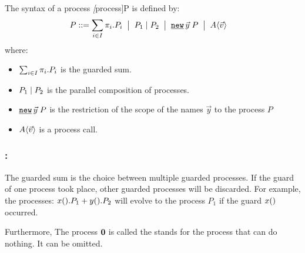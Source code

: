 \begin{definition}
\label{def_process_syntax}
The syntax of a \picalc{} process \textit[process]{P} is defined by: 
\begin{align*}
 P & \syntdef \procsum \ebnf \procpar{P_1}{P_2} \ebnf \procres{\vec{y}}{P} \ebnf \proccall{A}{\vec{v}}
\end{align*}
where:
\begin{itemize}
\item $\sum_{i\in I}{\pi_i.P_i}$ is the guarded sum.
\item $P_1 \mid P_2$ is the parallel composition of processes.
\item $\procres{\vec{y}}{P}$ is the restriction of the scope of the names $\vec{y}$ to the process $P$
\item $A\langle\vec{v}\rangle$ is a process call. 
\end{itemize}
\end{definition}

\subsubsection{:} The guarded sum is the choice between multiple guarded processes. If the guard of one process took place, other guarded processes will be discarded. For example, the processes: $x().P_1 + y().P_2$ will evolve to the process $P_1$ if the guard $x()$ occurred.

Furthermore, The process $\mathbf{0}$ is called the  stands for the process that can do nothing. It can be omitted.
